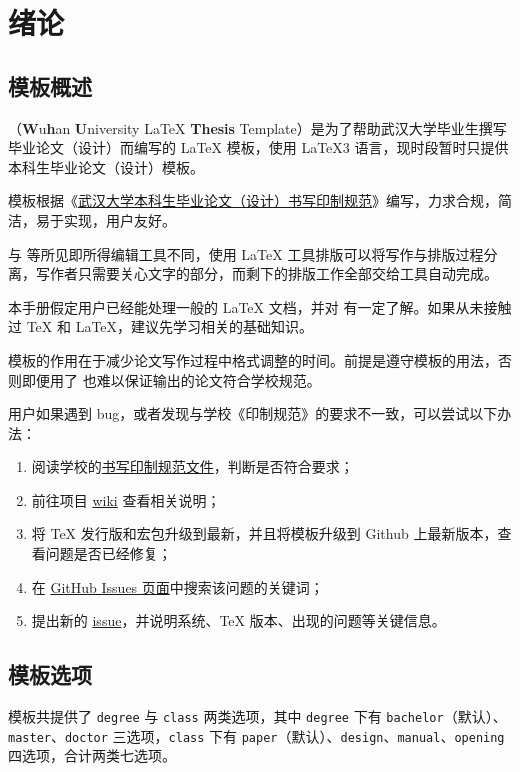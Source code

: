 
\chapter{绪论}
\section{模板概述}
\WhuThesis{}（\textbf{W}u\textbf{h}an \textbf{U}niversity \LaTeX{} \textbf{Thesis} Template）是为了帮助武汉大学毕业生撰写毕业论文（设计）而编写的 \LaTeX{} 模板，使用 \LaTeX3 语言，现时段暂时只提供本科生毕业论文（设计）模板。

模板根据《\href{https://github.com/mtobeiyf/whu-thesis/files/4638713/default.pdf}{武汉大学本科生毕业论文（设计）书写印制规范}》编写，力求合规，简洁，易于实现，用户友好。

与  等所见即所得编辑工具不同，使用 \LaTeX{} 工具排版可以将写作与排版过程分离，写作者只需要关心文字的部分，而剩下的排版工作全部交给工具自动完成。

本手册假定用户已经能处理一般的 \LaTeX{} 文档，并对  有一定了解。如果从未接触过 \TeX{} 和 \LaTeX{}，建议先学习相关的基础知识。

\begin{notice}
    模板的作用在于减少论文写作过程中格式调整的时间。前提是遵守模板的用法，否则即便用了 \WhuThesis 也难以保证输出的论文符合学校规范。
\end{notice}

用户如果遇到 bug，或者发现与学校《印制规范》的要求不一致，可以尝试以下办法：
\begin{enumerate}
    \item 阅读学校的\href{https://github.com/mtobeiyf/whu-thesis/files/4638713/default.pdf}{书写印制规范文件}，判断是否符合要求；
    \item 前往项目 \href{https://github.com/mtobeiyf/whu-thesis/wiki}{wiki} 查看相关说明；
    \item 将 \TeX{} 发行版和宏包升级到最新，并且将模板升级到 Github 上最新版本，查看问题是否已经修复；
    \item 在 \href{https://github.com/mtobeiyf/whu-thesis/issues}{GitHub Issues 页面}中搜索该问题的关键词；
    \item 提出新的 \href{https://github.com/mtobeiyf/whu-thesis/issues}{issue}，并说明系统、\TeX{} 版本、出现的问题等关键信息。
\end{enumerate}

\section{模板选项}
模板共提供了 \verb|degree| 与 \verb|class| 两类选项，其中 \verb|degree| 下有 \verb|bachelor|（默认）、\verb|master|、\verb|doctor| 三选项，\verb|class| 下有 \verb|paper|（默认）、\verb|design|、\verb|manual|、\verb|opening| 四选项，合计两类七选项。

